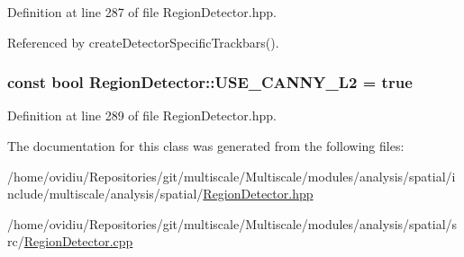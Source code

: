 \-Definition at line 287 of file \-Region\-Detector.\-hpp.



\-Referenced by create\-Detector\-Specific\-Trackbars().

\hypertarget{classmultiscale_1_1analysis_1_1RegionDetector_a6a8c4f7b9a6bc40ec6de940f53943772}{
\subsubsection[{\-U\-S\-E\-\_\-\-C\-A\-N\-N\-Y\-\_\-\-L2}]{\setlength{\rightskip}{0pt plus 5cm}const bool {\bf \-Region\-Detector\-::\-U\-S\-E\-\_\-\-C\-A\-N\-N\-Y\-\_\-\-L2} = true}}\label{classmultiscale_1_1analysis_1_1RegionDetector_a6a8c4f7b9a6bc40ec6de940f53943772}


\-Definition at line 289 of file \-Region\-Detector.\-hpp.



\-The documentation for this class was generated from the following files\-:\begin{DoxyCompactItemize}
\item 
/home/ovidiu/\-Repositories/git/multiscale/\-Multiscale/modules/analysis/spatial/include/multiscale/analysis/spatial/\hyperlink{RegionDetector_8hpp}{\-Region\-Detector.\-hpp}\item 
/home/ovidiu/\-Repositories/git/multiscale/\-Multiscale/modules/analysis/spatial/src/\hyperlink{RegionDetector_8cpp}{\-Region\-Detector.\-cpp}\end{DoxyCompactItemize}

